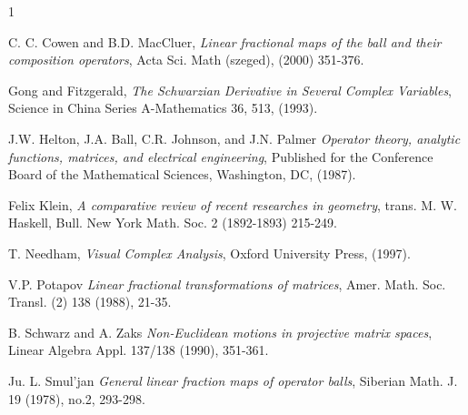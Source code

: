 \documentclass{amsart}
\theoremstyle{theorem}
\theoremstyle{lemma}
\theoremstyle{definition}
\begin{document}
\begin{thebibliography}{1}

 C. C. Cowen and B.D. MacCluer, \textit{Linear fractional maps of the ball and their composition operators}, Acta Sci. Math (szeged), (2000) 351-376.

 Gong and Fitzgerald, \textit{The Schwarzian Derivative in Several Complex Variables}, Science in China Series A-Mathematics 36, 513, (1993).

 J.W. Helton, J.A. Ball, C.R. Johnson, and J.N. Palmer \textit{Operator theory, analytic functions, matrices, and electrical engineering}, Published for the Conference Board of the Mathematical Sciences, Washington, DC, (1987).

 Felix Klein, \textit{A comparative review of recent researches in geometry}, trans. M. W. Haskell, Bull. New York Math. Soc. 2 (1892-1893) 215-249.

 T. Needham, \textit{Visual Complex Analysis}, Oxford University Press, (1997).

 V.P. Potapov \textit{Linear fractional transformations of matrices}, Amer. Math. Soc. Transl. (2) 138 (1988), 21-35.

 B. Schwarz and A. Zaks \textit{Non-Euclidean motions in projective matrix spaces}, Linear Algebra Appl. 137/138 (1990), 351-361.

 Ju. L. Smul'jan \textit{General linear fraction maps of operator balls}, Siberian Math. J. 19 (1978), no.2, 293-298.

\end{thebibliography}
\end{document}
